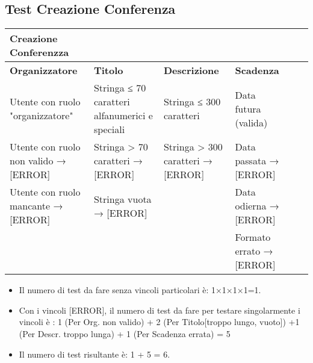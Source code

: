 \subsection{Test Creazione Conferenza}
\label{sec:test_creaszione_conferenzza}

\begin{tabular}{|p{3.5cm}|p{2cm}|p{2cm}|p{3cm}|p{2cm}|p{2cm}|}
\hline
\rowcolor{SkyBlue}
\textbf{Creazione Conferenzza} & & &\\
\hline
\rowcolor{Red}
\textbf{Organizzatore} & \textbf{Titolo} & \textbf{Descrizione} & \textbf{Scadenza}  \\
\hline
 Utente con ruolo "organizzatore" & Stringa ≤ 70 caratteri alfanumerici e speciali &  Stringa ≤ 300 caratteri & Data futura (valida) \\
Utente con ruolo non valido → [ERROR] &  Stringa > 70 caratteri → [ERROR] & Stringa > 300 caratteri → [ERROR] & Data passata → [ERROR] \\
Utente con ruolo mancante → [ERROR] & Stringa vuota → [ERROR] &  & Data odierna → [ERROR] \\
& & & Formato errato → [ERROR] \\
\hline
\end{tabular}

\begin{itemize}
\item Il numero di test da fare senza vincoli particolari è: 1×1×1×1=1.
\item Con i vincoli [ERROR], il numero di test da fare per testare singolarmente i vincoli è : 1 (Per Org. non valido) + 2 (Per Titolo[troppo lungo, vuoto]) +1 (Per Descr. troppo lunga) + 1 (Per Scadenza errata) = 5
\item Il numero di test risultante è: 1 + 5 = 6.
\end{itemize}

